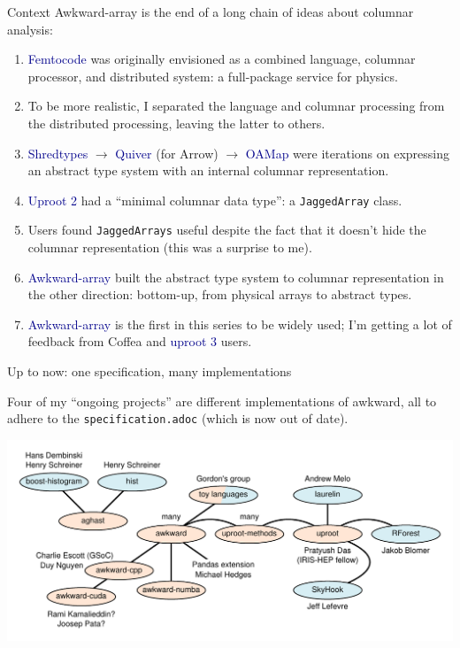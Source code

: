 \documentclass[aspectratio=169]{beamer}
\begin{document}
\begin{frame}{Context}
\large
\vspace{0.35 cm}
Awkward-array is the end of a long chain of ideas about columnar analysis:

\vspace{0.25 cm}
\begin{enumerate}
  \item \textcolor{darkblue}{Femtocode} was originally envisioned as a combined language, columnar processor, and distributed system: a full-package service for physics.
  \item To be more realistic, I separated the language and columnar processing from the distributed processing, leaving the latter to others.
  \item \textcolor{darkblue}{Shredtypes} $\to$ \textcolor{darkblue}{Quiver} (for Arrow) $\to$ \textcolor{darkblue}{OAMap} were iterations on expressing an abstract type system with an internal columnar representation.
  \item \textcolor{darkblue}{Uproot 2} had a ``minimal columnar data type'': a {\tt JaggedArray} class.
  \item Users found {\tt JaggedArrays} useful despite the fact that it doesn't hide the columnar representation (this was a surprise to me).
  \item \textcolor{darkblue}{Awkward-array} built the abstract type system to columnar representation in the other direction: bottom-up, from physical arrays to abstract types.
  \item \textcolor{darkblue}{Awkward-array} is the first in this series to be widely used; I'm getting a lot of feedback from Coffea and \textcolor{darkblue}{uproot 3} users.
\end{enumerate}
\end{frame}

\begin{frame}{Up to now: one specification, many implementations}
\large
\vspace{0.5 cm}

Four of my ``ongoing projects'' are different implementations of awkward, all to adhere to the {\tt specification.adoc} (which is now out of date).

\includegraphics[width=\linewidth]{projects.pdf}
\end{frame}
\end{document}
